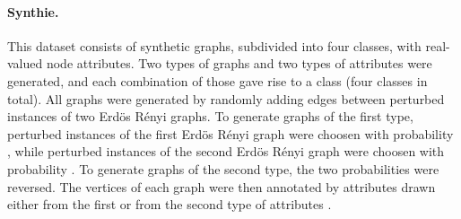 \documentclass[twoside,11pt]{article}
\begin{document}
\paragraph{Synthie.} This dataset consists of  synthetic graphs, subdivided into four classes, with  real-valued node attributes.
Two types of graphs and two types of attributes were generated, and each combination of those gave rise to a class (four classes in total).
All graphs were generated by randomly adding edges between  perturbed instances of two Erd{\"o}s R{\'e}nyi graphs.
To generate graphs of the first type, perturbed instances of the first Erd{\"o}s R{\'e}nyi graph were choosen with probability , while perturbed instances of the second Erd{\"o}s R{\'e}nyi graph were choosen with probability .
To generate graphs of the second type, the two probabilities were reversed.
The vertices of each graph were then annotated by attributes drawn either from the first or from the second type of attributes \cite{morris2016faster}.
\end{document}
